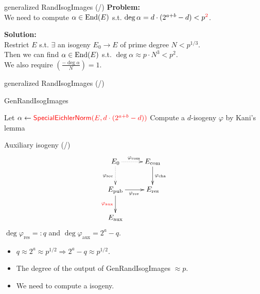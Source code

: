 \begin{frame}{generalized RandIsogImages (/\genRIItotal{})}
    \textbf{Problem:}\\
    We need to compute $\alpha \in \mathrm{End}(E)$ s.t. $\deg\alpha = d\cdot(2^{a+b} - d) < p^{\textcolor{red}{2}}$.

    \vspace*{10pt}
    \textbf{Solution:}\\
    Restrict $E$ s.t.
    $\exists$ an isogeny $E_0 \to E$ of prime degree $N < p^{1/3}$.\\[3pt]
    Then we can find $\alpha \in \mathrm{End}(E)$ s.t. $\deg\alpha \approx p\cdot N^3 < p^2$.\\[3pt]
    We also require $\left(\frac{-\deg\alpha}{N}\right) = 1$.
\end{frame}

\begin{frame}{generalized RandIsogImages (/\genRIItotal{})}
    \begin{algorithm}[H]
        \caption{\textsf{GenRandIsogImages}}
        \BlankLine
        Let $\alpha \leftarrow \textcolor{red}{\textsf{SpecialEichlerNorm}(E, d\cdot(2^{a+b} - d))}$\;
        Compute a $d$-isogeny $\varphi$ by Kani's lemma\;
        \Return{$\varphi$}\;
    \end{algorithm}
\end{frame}

\newcommand*{\auxRIItotal}{\total{auxRIIcnt}}
\begin{frame}{Auxiliary isogeny (/\auxRIItotal{})}
    \vspace{-10pt}
    $$
    \xymatrix{
        E_0 \ar@{..>}[r]^{\varphi_\mathrm{com}} \ar@{..>}[d]_{\varphi_\mathrm{sec}} & E_\mathrm{com} \ar[d]^{\varphi_\mathrm{cha}} \\
        E_\mathrm{pub} \ar[r]_{\varphi_\mathrm{res}} \ar[d]_{\red{\varphi_\mathrm{aux}}} & E_\mathrm{res}\\
        E_\mathrm{aux} & 
    }
    $$
    $\deg\varphi_\mathrm{res} =: q$ and $\deg\varphi_\mathrm{aux} = 2^a - q$.

    \vspace*{10pt}
    \begin{itemize}
        \item $q \approx 2^a \approx p^{1/2} \Rightarrow 2^a - q \approx p^{1/2}$.
        \item The degree of the output of \textsf{GenRandIsogImages} $\approx p$.
        \item We need to compute a  isogeny.
    \end{itemize}
\end{frame}

